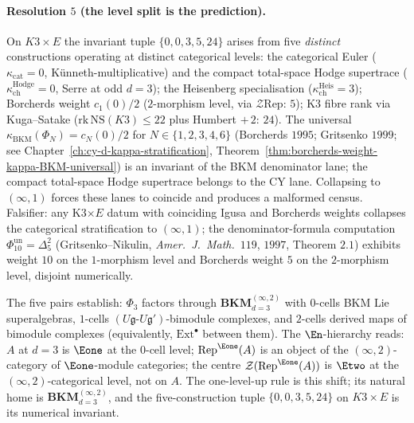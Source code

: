 \paragraph{Resolution \texorpdfstring{$5$}{5} (the level split is the prediction).}
On $K3\times E$ the invariant tuple $\{0, 0, 3, 5, 24\}$
arises from five \emph{distinct} constructions operating at distinct
categorical levels: the categorical Euler ($\kappa_{\mathrm{cat}}=0$,
K\"unneth-multiplicative) and the compact total-space Hodge supertrace
($\kappa_{\mathrm{ch}}^{\mathrm{Hodge}}=0$, Serre at odd $d=3$);
the Heisenberg specialisation ($\kappa_{\mathrm{ch}}^{\mathrm{Heis}}=3$);
Borcherds weight
$c_1(0)/2$ ($2$-morphism level, via $\mathcal Z\mathrm{Rep}$: $5$);
K3 fibre rank via Kuga--Satake
($\mathrm{rk}\,\mathrm{NS}(K3)\leq 22$ plus Humbert $+\,2$: $24$).
The universal $\kappa_{\mathrm{BKM}}(\Phi_N)=c_N(0)/2$ for
$N\in\{1,2,3,4,6\}$ (Borcherds $1995$; Gritsenko $1999$; see
Chapter~\ref{ch:cy-d-kappa-stratification},
Theorem~\ref{thm:borcherds-weight-kappa-BKM-universal}) is an
invariant of the BKM denominator lane; the compact total-space
Hodge supertrace belongs to the CY lane. Collapsing to $(\infty,1)$
forces these lanes to coincide and produces a malformed census.
Falsifier: any K3$\times E$ datum with coinciding
Igusa and Borcherds weights collapses the categorical stratification
to $(\infty,1)$; the denominator-formula computation
$\Phi_{10}^{\mathrm{un}}=\Delta_5^2$ (Gritsenko--Nikulin, \emph{Amer.\ J.\ Math.}\
$119$, $1997$, Theorem $2$.$1$) exhibits weight $10$ on the
$1$-morphism level and Borcherds weight $5$ on the $2$-morphism
level, disjoint numerically.

\begin{remark}
\label{rem:qgf-infty2-one-level-up}
The five pairs establish: $\Phi_3$ factors through
$\mathbf{BKM}^{(\infty,2)}_{d=3}$ with $0$-cells BKM Lie
superalgebras, $1$-cells
$(U\mathfrak g\text{-}U\mathfrak g')$-bimodule complexes, and
$2$-cells derived maps of bimodule complexes (equivalently,
$\mathrm{Ext}^\bullet$ between them). The $\En$-hierarchy reads:
$A$ at $d=3$ is $\Eone$ at the $0$-cell level;
$\mathrm{Rep}^{\Eone}(A)$ is an object of the $(\infty,2)$-category
of $\Eone$-module categories; the centre
$\mathcal Z(\mathrm{Rep}^{\Eone}(A))$ is $\Etwo$ at the
$(\infty,2)$-categorical level, not on $A$. The one-level-up rule
is this shift; its natural home is $\mathbf{BKM}^{(\infty,2)}_{d=3}$,
and the five-construction tuple $\{0,0,3,5,24\}$ on $K3\times E$ is its
numerical invariant.
\end{remark}

